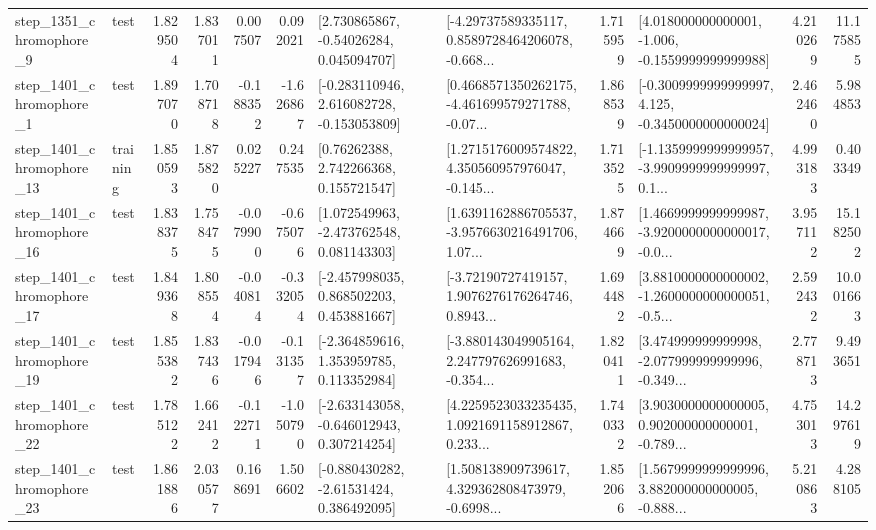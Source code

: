 \begin{tabular}{llrrrrllrlrr}
  step\_1351\_chromophore\_9 &      test &      1.829504 &    1.837011 &      0.007507 &  0.092021 &     [2.730865867, -0.54026284, 0.045094707] &  [-4.29737589335117, 0.8589728464206078, -0.668... &       1.715959 &   [4.018000000000001, -1.006, -0.1559999999999988] &            4.210269 &         11.175855 \\
  step\_1401\_chromophore\_1 &      test &      1.897070 &    1.708718 &     -0.188352 & -1.626867 &   [-0.283110946, 2.616082728, -0.153053809] &  [0.4668571350262175, -4.461699579271788, -0.07... &       1.868539 &  [-0.3009999999999997, 4.125, -0.3450000000000024] &            2.462460 &          5.984853 \\
 step\_1401\_chromophore\_13 &  training &      1.850593 &    1.875820 &      0.025227 &  0.247535 &      [0.76262388, 2.742266368, 0.155721547] &  [1.2715176009574822, 4.350560957976047, -0.145... &       1.713525 &  [-1.1359999999999957, -3.9909999999999997, 0.1... &            4.993183 &          0.403349 \\
 step\_1401\_chromophore\_16 &      test &      1.838375 &    1.758475 &     -0.079900 & -0.675076 &    [1.072549963, -2.473762548, 0.081143303] &  [1.6391162886705537, -3.9576630216491706, 1.07... &       1.874669 &  [1.4669999999999987, -3.9200000000000017, -0.0... &            3.957112 &         15.182502 \\
 step\_1401\_chromophore\_17 &      test &      1.849368 &    1.808554 &     -0.040814 & -0.332054 &    [-2.457998035, 0.868502203, 0.453881667] &  [-3.72190727419157, 1.9076276176264746, 0.8943... &       1.694482 &  [3.8810000000000002, -1.2600000000000051, -0.5... &            2.592432 &         10.001663 \\
 step\_1401\_chromophore\_19 &      test &      1.855382 &    1.837436 &     -0.017946 & -0.131357 &    [-2.364859616, 1.353959785, 0.113352984] &  [-3.880143049905164, 2.247797626991683, -0.354... &       1.820411 &  [3.474999999999998, -2.077999999999996, -0.349... &            2.778713 &          9.493651 \\
 step\_1401\_chromophore\_22 &      test &      1.785122 &    1.662412 &     -0.122711 & -1.050790 &   [-2.633143058, -0.646012943, 0.307214254] &  [4.2259523033235435, 1.0921691158912867, 0.233... &       1.740332 &  [3.9030000000000005, 0.902000000000001, -0.789... &            4.753013 &         14.297619 \\
 step\_1401\_chromophore\_23 &      test &      1.861886 &    2.030577 &      0.168691 &  1.506602 &    [-0.880430282, -2.61531424, 0.386492095] &  [1.508138909739617, 4.329362808473979, -0.6998... &       1.852066 &  [1.5679999999999996, 3.882000000000005, -0.888... &            5.210863 &          4.288105 \\

\end{tabular}
